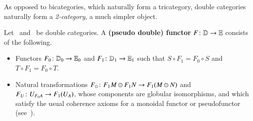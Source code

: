 
As opposed to bicategories, which naturally form a tricategory, double
categories naturally form a \emph{2-category}, a much simpler object.

\begin{defn}
  Let \lD\ and \lE\ be double categories.  A \textbf{(pseudo double)
    functor} $F\colon \mathbb{D}\to \mathbb{E}$ consists of the following.
  \begin{itemize}
  \item Functors $F_0\colon \mathbb{D}_0 \to \mathbb{E}_0$ and $F_1\colon \mathbb{D}_1 \to
    \mathbb{E}_1$ such that $S\circ F_1 = F_0\circ S$ and $T\circ F_1 =
    F_0\circ T$.
  \item Natural transformations $F_\odot\colon F_1M \odot F_1N \to
    F_1(M\odot N)$ and $F_U\colon U_{F_0 A} \to F_1(U_A)$, whose
    components are globular isomorphisms, and which satisfy the usual
    coherence axioms for a monoidal functor or pseudofunctor
    (see~\cite[\S{}XI.2]{maclane}).
  \end{itemize}
\end{defn}

